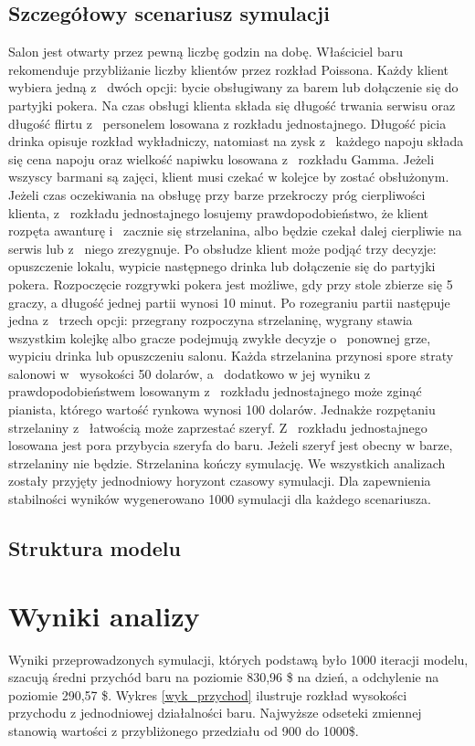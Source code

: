 \documentclass[12pt, a4paper, oneside]{mwart} %
\begin{document}
\subsection{Szczegółowy scenariusz symulacji}
Salon jest otwarty przez pewną liczbę godzin na dobę. Właściciel baru rekomenduje przybliżanie liczby klientów przez rozkład Poissona. Każdy klient wybiera jedną z~ dwóch opcji: bycie obsługiwany za barem lub dołączenie się do partyjki pokera. Na czas obsługi klienta składa się długość trwania serwisu oraz długość flirtu z~ personelem losowana z rozkładu jednostajnego. Długość picia drinka opisuje rozkład wykładniczy, natomiast na zysk z~ każdego napoju składa się cena napoju oraz wielkość napiwku losowana z~ rozkładu Gamma. Jeżeli wszyscy barmani są zajęci, klient musi czekać w kolejce by zostać obsłużonym. Jeżeli czas oczekiwania na obsługę przy barze przekroczy próg cierpliwości klienta, z~ rozkładu jednostajnego losujemy prawdopodobieństwo, że klient rozpęta awanturę i~ zacznie się strzelanina, albo będzie czekał dalej cierpliwie na serwis lub z~ niego zrezygnuje. Po obsłudze klient może podjąć trzy decyzje: opuszczenie lokalu, wypicie następnego drinka lub dołączenie się do partyjki pokera. Rozpoczęcie rozgrywki pokera jest możliwe, gdy przy stole zbierze się 5 graczy, a długość jednej partii wynosi 10 minut. Po rozegraniu partii następuje jedna z~ trzech opcji: przegrany rozpoczyna strzelaninę, wygrany stawia wszystkim kolejkę albo gracze podejmują zwykłe decyzje o~ ponownej grze, wypiciu drinka lub opuszczeniu salonu. Każda strzelanina przynosi spore straty salonowi w~ wysokości 50 dolarów, a~ dodatkowo w jej wyniku z~ prawdopodobieństwem losowanym z~ rozkładu jednostajnego może zginąć pianista, którego wartość rynkowa wynosi 100 dolarów. Jednakże rozpętaniu strzelaniny z~ łatwością może zaprzestać szeryf. Z~ rozkładu jednostajnego losowana jest pora przybycia szeryfa do baru. Jeżeli szeryf jest obecny w barze, strzelaniny nie będzie. Strzelanina kończy symulację. We wszystkich analizach zostały przyjęty jednodniowy horyzont czasowy symulacji. Dla zapewnienia stabilności wyników wygenerowano 1000 symulacji dla każdego scenariusza.

\subsection{Struktura modelu}

\section{Wyniki analizy}
Wyniki przeprowadzonych symulacji, których podstawą było 1000 iteracji modelu, szacują średni przychód baru na poziomie 830,96 \$ na dzień, a odchylenie na poziomie 290,57 \$. Wykres \ref{wyk_przychod} ilustruje rozkład wysokości przychodu z jednodniowej działalności baru. Najwyższe odseteki zmiennej stanowią wartości z przybliżonego przedziału od 900 do 1000\$.
\end{document}
